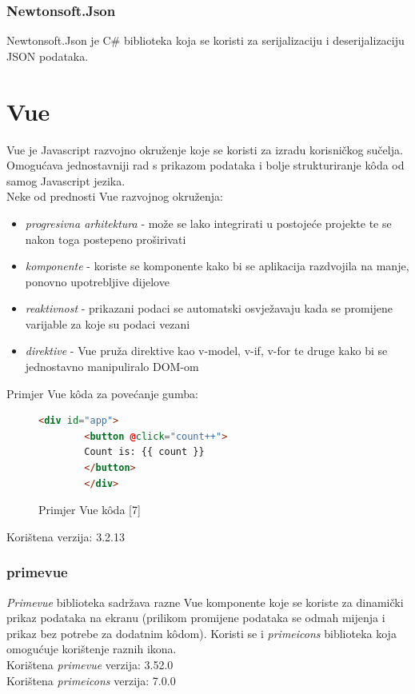 \documentclass[zavrsnirad]{fer}
\begin{document}
\subsubsection{Newtonsoft.Json}
Newtonsoft.Json je C\# biblioteka koja se koristi za serijalizaciju i deserijalizaciju JSON podataka.

\section{Vue}
\label{pog:vue}
Vue je Javascript razvojno okruženje koje se koristi za izradu korisničkog sučelja. Omogućava jednostavniji rad s prikazom podataka i bolje strukturiranje kôda od samog Javascript jezika.
\\Neke od prednosti Vue razvojnog okruženja:
\begin{itemize}
	\item \textit{progresivna arhitektura} - može se lako integrirati u postojeće projekte te se nakon toga postepeno proširivati
	\item \textit{komponente} - koriste se komponente kako bi se aplikacija razdvojila na manje, ponovno upotrebljive dijelove
	\item \textit{reaktivnost} - prikazani podaci se automatski osvježavaju kada se promijene varijable za koje su podaci vezani
	\item \textit{direktive} - Vue pruža direktive kao v-model, v-if, v-for te druge kako bi se jednostavno manipuliralo DOM-om
\end{itemize}

Primjer Vue kôda za povećanje gumba:
\begin{figure}[htb]
	\centering
	\begin{lstlisting}[language=html]
		<div id="app">
		<button @click="count++">
		Count is: {{ count }}
		</button>
		</div>
	\end{lstlisting}
	\caption{Primjer Vue kôda [7]}
\end{figure}
\FloatBarrier

Korištena verzija: 3.2.13

\subsubsection{primevue}
\textit{Primevue} biblioteka sadržava razne Vue komponente koje se koriste za dinamički prikaz podataka na ekranu (prilikom promijene podataka se odmah mijenja i prikaz bez potrebe za dodatnim kôdom). Koristi se i \textit{primeicons} biblioteka koja omogućuje korištenje raznih ikona.
\\Korištena \textit{primevue} verzija: 3.52.0
\\Korištena \textit{primeicons} verzija: 7.0.0
\end{document}
